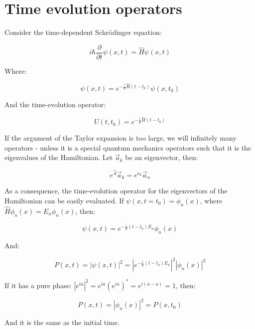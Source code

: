 \section{Time evolution operators}
Consider the time-dependent Schr\"odinger equation:

$$i\hbar\frac{\partial}{\partial t}\psi(x,t) = \hat{H}\psi(x,t)$$

Where:

$$\psi(x,t) = e^{-\frac{i}{\hbar}\hat{H}(t-t_0)}\psi(x,t_0)$$

And the time-evolution operator:

$$U(t,t_0) = e^{-\frac{i}{\hbar}\hat{H}(t-t_0)}$$

If the argument of the Taylor expansion is too large, we will infinitely many operators - unless it is a special quantum mechanics operators such that it is the eigenvalues of the Hamiltonian.
Let $\vec{a}_k$ be an eigenvector, then:

$$e^{\hat{A}}\vec{a}_k = e^{a_k}\vec{a}_n$$

As a consequence, the time-evolution operator for the eigenvectors of the Hamiltonian can be easily evaluated.
If $\psi(x,t=t_0) = \phi_n(x)$, where $\hat{H}\phi_n(x) = E_n\phi_n(x)$, then:

$$\psi(x,t) = e^{-\frac{i}{\hbar}(t-t_0)E_n}\phi_n(x)$$

And:

$$P(x,t) = |\psi(x,t)|^2 = |e^{-\frac{i}{\hbar}(t-t_0)E_n}|^2|\phi_n(x)|^2$$

If it has a pure phase: $|e^{ia}|^2 = e^{ia}(e^{ia})^* = e^{i(a-a)} = 1$, then:

$$P(x,t) = |\phi_n(x)|^2 = P(x,t_0)$$

And it is the same as the initial time.
